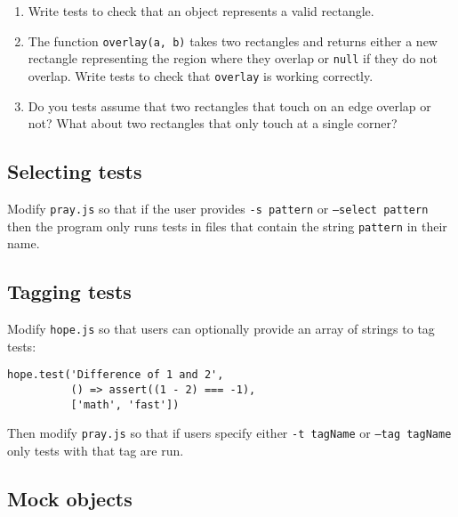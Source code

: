 \documentclass[krantzl]{krantz}
\begin{document}
\begin{enumerate}

\item 

Write tests to check that an object represents a valid rectangle.



\item 

The function \texttt{overlay(a, b)} takes two rectangles and returns either
    a new rectangle representing the region where they overlap or \texttt{null} if they do not overlap.
    Write tests to check that \texttt{overlay} is working correctly.



\item 

Do you tests assume that two rectangles that touch on an edge overlap or not?
    What about two rectangles that only touch at a single corner?



\end{enumerate}

\subsection*{Selecting tests}


Modify \texttt{pray.js} so that if the user provides \texttt{-s pattern} or \texttt{--select pattern}
then the program only runs tests in files that contain the string \texttt{pattern} in their name.

\subsection*{Tagging tests}


Modify \texttt{hope.js} so that users can optionally provide an array of strings to tag tests:

\begin{lstlisting}[frame=single,frameround=tttt]
hope.test('Difference of 1 and 2',
          () => assert((1 - 2) === -1),
          ['math', 'fast'])
\end{lstlisting}


Then modify \texttt{pray.js} so that if users specify either \texttt{-t tagName} or \texttt{--tag tagName}
only tests with that tag are run.

\subsection*{Mock objects}
\end{document}
